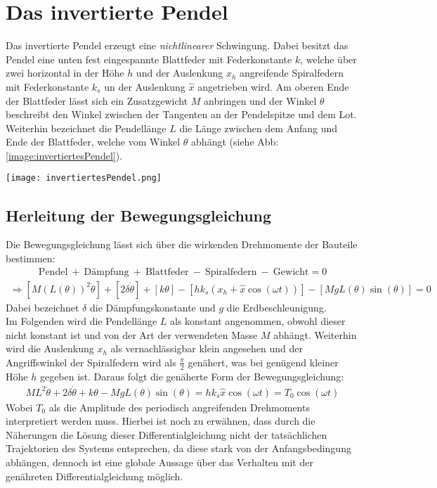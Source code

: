 

\section{Das invertierte Pendel}
\label{sec:invertPendel}
Das invertierte Pendel erzeugt eine \textit{nichtlinearer} Schwingung. Dabei besitzt das Pendel eine unten fest eingespannte Blattfeder mit Federkonstante $k$, welche über zwei horizontal in der Höhe $h$ und der Auslenkung $x_h$ angreifende Spiralfedern mit Federkonstante $k_s$ un der Auslenkung $\hat{x}$ angetrieben wird. Am oberen Ende der Blattfeder lässt sich ein Zusatzgewicht $M$ anbringen und der Winkel $\theta$ beschreibt den Winkel zwischen der Tangenten an der Pendelspitze und dem Lot. Weiterhin bezeichnet die Pendellänge $L$ die Länge zwischen dem Anfang und Ende der Blattfeder, welche vom Winkel $\theta$ abhängt (siehe Abb: \ref{image:invertiertesPendel}).
\begin{center}
    \texttt{[image: invertiertesPendel.png]}
    \label{image:invertiertesPendel}
\end{center}
\subsection{Herleitung der Bewegungsgleichung}
\label{sub:bewegungsgleichung}
Die Bewegungsgleichung lässt sich über die wirkenden Drehmomente der Bauteile bestimmen:
\begin{gather*}
        \text{Pendel}~+~\text{Dämpfung}~+~\text{Blattfeder}~-~\text{Spiralfedern}~-~\text{Gewicht} = 0
\end{gather*}
\begin{gather}
    \Rightarrow [M(L(\theta))^2\ddot{\theta}]+[2\delta\dot{\theta}]+[k\theta]-[hk_s(x_h+\hat{x}\cos(\omega t))]-[MgL(\theta)\sin(\theta)]=0
\end{gather}
Dabei bezeichnet $\delta$ die Dämpfungskonstante und $g$ die Erdbeschleunigung.\\
Im Folgenden wird die Pendellänge $L$ als konstant angenommen, obwohl dieser nicht konstant ist und von der Art der verwendeten Masse $M$ abhängt. Weiterhin wird die Auslenkung $x_h$ als vernachlässigbar klein angesehen und der Angriffswinkel der Spiralfedern wird als $\frac{\pi}{2}$ genähert, was bei genügend kleiner Höhe $h$ gegeben ist.
Daraus folgt die genäherte Form der Bewegungsgleichung:
\begin{gather}
    ML^2\ddot{\theta}+2\delta\dot{\theta}+k\theta-MgL(\theta)\sin(\theta)=hk_s\hat{x}\cos(\omega t)=T_0\cos(\omega t)
\end{gather}
Wobei $T_0$ als die Amplitude des periodisch angreifenden Drehmoments interpretiert werden muss. Hierbei ist noch zu erwähnen, dass durch die Näherungen die Lösung dieser Differentialgleichung nicht der tatsächlichen Trajektorien des Systems entsprechen, da diese stark von der Anfangsbedingung abhängen, dennoch ist eine globale Aussage über das Verhalten mit der genähreten Differentialgleichung möglich. \citep{Lueck}


